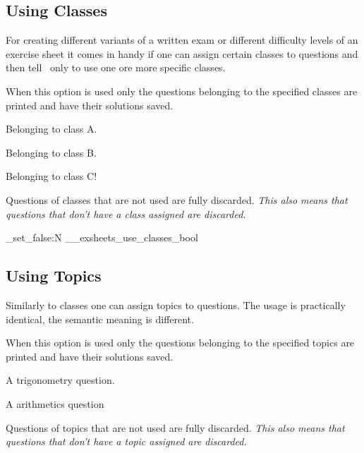 \documentclass[load-preamble+]{cnltx-doc}
\begin{document}
\subsection{Using Classes}\label{sec:classes}
For creating different variants of a written exam or different difficulty
levels of an exercise sheet it comes in handy if one can assign certain
classes to questions and then tell \ExSheets\ only to use one ore more
specific classes.
\begin{options}
  \Default
    When this option is used only the questions belonging to the specified
    classes are printed and have their solutions saved.
\end{options}
\begin{example}
  \begin{question}[class=A]
    Belonging to class A.
  \end{question}
  \begin{question}[class=B]
    Belonging to class B.
  \end{question}
  \begin{question}[class=C]
    Belonging to class C!
  \end{question}
\end{example}
Questions of classes that are not used are fully discarded. \emph{This also
  means that questions that don't have a class assigned are discarded.}

\ExplSyntaxOn
 \bool_set_false:N \g__exsheets_use_classes_bool
\ExplSyntaxOff

\subsection{Using Topics}\label{sec:topics}
Similarly to classes one can assign topics to questions. The usage is
practically identical, the semantic meaning is different.
\begin{options}
  \Default
    When this option is used only the questions belonging to the specified
    topics are printed and have their solutions saved.
\end{options}
\begin{example}
  \begin{question}[topic=trigonometry]
    A trigonometry question.
  \end{question}
  \begin{question}[topic=arithmetics]
    A arithmetics question
  \end{question}
\end{example}
Questions of topics that are not used are fully discarded. \emph{This also
  means that questions that don't have a topic assigned are discarded.}
\end{document}
